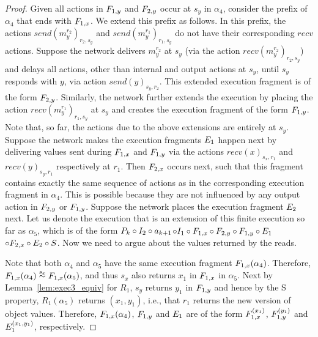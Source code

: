 \begin{proof}
Given all actions  in $ \fragt{F_{1,y}}{\alpha_4}{} $ and 
  $\fragt{F_{2,y}}{\alpha_4}{}$ occur at $s_y$ in $\alpha_4$, consider the prefix of $\alpha_4$ that ends with $\fragn{F_{1,x}}{\alpha''}{x_1}$. We extend this prefix as follows.
In this prefix,  the actions $send(m_y^{r_2})_{r_2, s_y}$ and 
 $send(m_y^{r_1})_{r_1, s_y}$ do not have their corresponding $recv$ actions.  Suppose  the network 
delivers $m_y^{r_2}$ at $s_y$ (via the action $recv(m_y^{r_2})_{r_2, s_y}$) and delays all actions, other than internal and output actions at $s_y$, until $s_y$ responds with $y$, via  action $send(y)_{s_y, r_2}$. This extended execution fragment is of the form $\fragt{F_{2,y}}{\alpha_4}{}$. Similarly, the network further extends the execution by placing  the 
action $recv(m_y^{r_1})_{r_1, s_y}$ at $s_y$  and creates the execution fragment of the form $\fragt{F_{1,y}}{\alpha_4}{}$. Note that, so far, the actions due to the above extensions are entirely at $s_y$. Suppose the network makes the execution 
fragments $\fragt{E_1}{\alpha''}{}$ happen next by delivering values sent during $\fragt{F_{1,x}}{\alpha_4}{}$ and $\fragt{F_{1,y}}{\alpha_4}{}$ via the actions  $recv(x)_{s_x, r_1}$ and $recv(y)_{s_y, r_1}$ respectively at $r_1$. Then $\fragt{F_{2,x}}{\alpha''}{}$ occurs next, such that this fragment contains exactly the same sequence of actions as  in the corresponding execution fragment in  $\alpha_4$.
This is possible because they are not influenced by  any output action in $\fragt{F_{2,y}}{\alpha_4}{}$  or $\fragt{F_{1,y}}{\alpha_4}{}$. 
Suppose the network places the execution fragment  $\fragt{E_2}{\alpha''}{}$ next.
Let us denote the execution that is an extension of this finite execution so far as $\alpha_5$, which is of the form $ \finiteprefixA{k-1}{k} \circ \fragt{I_2}{\alpha_5}{}  \circ a_{k+1} $$ \circ \fragt{I_1}{\alpha_5}{}
\circ \fragt{F_{1,x}}{\alpha_5}{} \circ \fragt{F_{2,y}}{\alpha_5}{} \circ  \fragt{F_{1,y}}{\alpha_5}{} \circ \fragt{E_1}{\alpha_5}{}
$$\circ \fragt{F_{2,x}}{\alpha_5}{} \circ  \fragt{E_2}{\alpha_5}{}\circ \fragt{S}{\alpha_5}{}$.
 Now we need to argue about the values returned by the reads.
 
Note that both $\alpha_4$ and $\alpha_5$ have the same execution fragment  $\frage{F_{1,x}}{\alpha_4}{}$. Therefore,   $\frage{F_{1,x}}{\alpha_4}{} \stackrel{s_x}{\sim} \frage{F_{1,x}}{\alpha_5}{}$, and thus $s_x$ also returns $x_1$ in $\fragt{F_{1,x}}{\alpha_4}{}$ in $\alpha_5$. Next  by Lemma~\ref{lem:exec3_equiv} for $R_1$,  $s_y$ returns $y_1$ in $\fragt{F_{1,y}}{\alpha_5}{}$  and  hence by the S property, $R_1(\alpha_5)$ returns $(x_1, y_1)$, i.e.,   that $r_1$ returns the new version of object values. Therefore, $\frage{F_{1,x}}{\alpha_4}{}$,  $\fragt{F_{1,y}}{\alpha_5}{}$ and $\fragt{E_1}{\alpha_5}{}$ are of the form $ \fragt{F_{1,x}}{\alpha_5}{x_1}$, $\fragt{F_{1,y}}{\alpha_5}{y_1}$ and  $\fragt{E_1}{\alpha_5}{x_1, y_1}$, respectively.


\end{proof}
